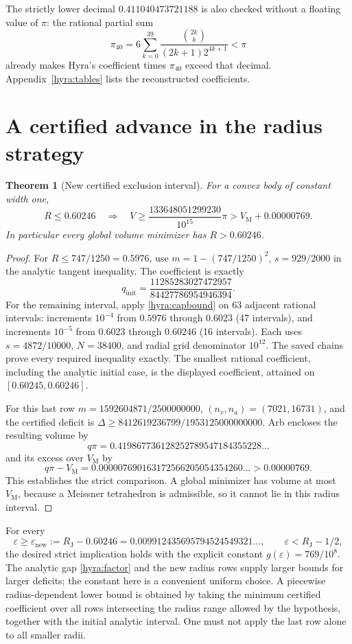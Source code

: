 \documentclass[11pt]{article}
\newtheorem{theorem}{Theorem}[section]
\theoremstyle{remark}\newtheorem{remark}[theorem]{Remark}
\newcommand{\VM}{V_{\mathrm M}}
\newcommand{\RJ}{R_{\mathrm J}}
\begin{document}
The strictly lower decimal $0.411040473721188$ is also checked without a floating value of $\pi$: the rational partial sum
\[
 \pi_{40}=6\sum_{k=0}^{39}\frac{\binom{2k}{k}}{(2k+1)2^{4k+1}}<\pi
\]
already makes Hyra's coefficient times $\pi_{40}$ exceed that decimal. Appendix~\ref{hyra:tables} lists the reconstructed coefficients.

\section{A certified advance in the radius strategy}
\begin{theorem}[New certified exclusion interval]\label{hyra:new}
For a convex body of constant width one,
\[
 R\leq0.60246\quad\Longrightarrow\quad
 V\geq\frac{133648051299230}{10^{15}}\pi
 >\VM+0.00000769.
\]
In particular every global volume minimizer has $R>0.60246$.
\end{theorem}
\begin{proof}
For $R\leq747/1250=0.5976$, use $m=1-(747/1250)^2$, $s=929/2000$ in the analytic tangent inequality. The coefficient is exactly
\[
 q_{\mathrm{init}}=\frac{11285283027472957}{84427786954946394}.
\]
For the remaining interval, apply \eqref{hyra:capbound} on 63 adjacent rational intervals: increments $10^{-4}$ from $0.5976$ through $0.6023$ (47 intervals), and increments $10^{-5}$ from $0.6023$ through $0.60246$ (16 intervals). Each uses $s=4872/10000$, $N=38400$, and radial grid denominator $10^{12}$. The saved chains prove every required inequality exactly. The smallest rational coefficient, including the analytic initial case, is the displayed coefficient, attained on $[0.60245,0.60246]$.

For this last row $m=1592604871/2500000000$, $(n_v,n_a)=(7021,16731)$, and the certified deficit is $\Delta\geq8412619236799/1953125000000000$. Arb encloses the resulting volume by
\[
 q\pi=0.419867736128252789547184355228\ldots
\]
and its excess over $\VM$ by
\[
 q\pi-\VM=0.000007690163172566205054354260\ldots>0.00000769.
\]
This establishes the strict comparison. A global minimizer has volume at most $\VM$, because a Meissner tetrahedron is admissible, so it cannot lie in this radius interval.
\end{proof}

For every
\[
 \varepsilon\geq\varepsilon_{\mathrm{new}}:=\RJ-0.60246
 =0.009912435695794524549321\ldots,
 \qquad \varepsilon<\RJ-1/2,
\]
the desired strict implication holds with the explicit constant $g(\varepsilon)=769/10^8$. The analytic gap \eqref{hyra:factor} and the new radius rows supply larger bounds for larger deficits; the constant here is a convenient uniform choice. A piecewise radius-dependent lower bound is obtained by taking the minimum certified coefficient over all rows intersecting the radius range allowed by the hypothesis, together with the initial analytic interval. One must not apply the last row alone to all smaller radii.
\end{document}
